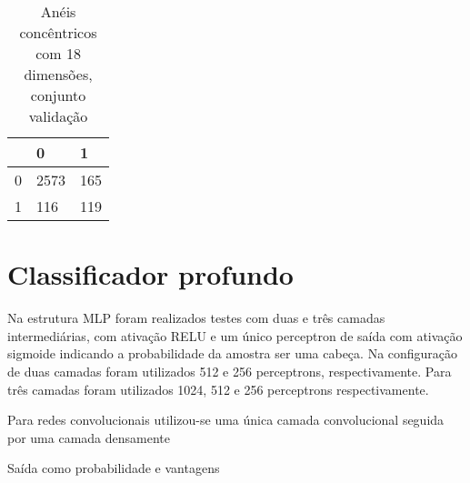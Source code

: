 \begin{table}[h!]
\centering
\caption{Anéis concêntricos com 18 dimensões, conjunto validação}
\begin{tabular}{l|l|l|}
\cline{2-3}
                        & 0 & 1 \\ \hline
\multicolumn{1}{|l|}{0} & 2573 & 165 \\ \hline
\multicolumn{1}{|l|}{1} & 116  & 119 \\ \hline
\end{tabular}
\end{table}

\section{Classificador profundo}

Na estrutura MLP foram realizados testes com duas e três camadas intermediárias, com ativação RELU e um único perceptron de saída com ativação sigmoide indicando a probabilidade da amostra ser uma cabeça. Na configuração de duas camadas foram utilizados 512 e 256 perceptrons, respectivamente. Para três camadas foram utilizados 1024, 512 e 256 perceptrons respectivamente. 

Para redes convolucionais utilizou-se uma única camada convolucional seguida por uma camada densamente 

Saída como probabilidade e vantagens
